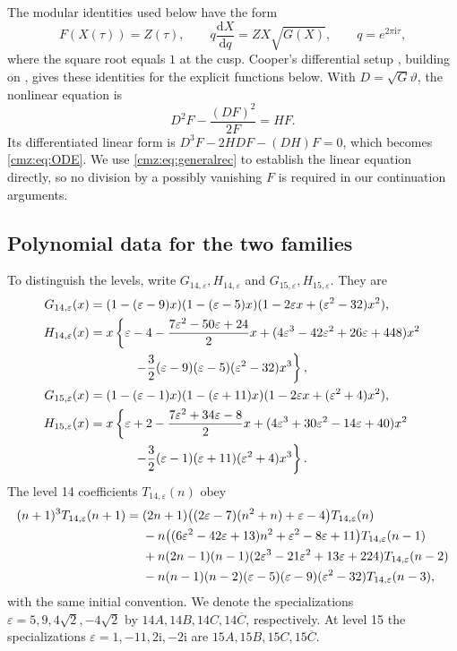 \documentclass[11pt,letterpaper]{article}
\numberwithin{equation}{section}
\theoremstyle{definition}\newtheorem{definition}[theorem]{Definition}
\theoremstyle{remark}\newtheorem{remark}[theorem]{Remark}
\newcommand{\eps}{\varepsilon}
\newcommand{\dd}{\mathrm d}
\newcommand{\ii}{\mathrm i}
\newcommand{\tht}{\vartheta}
\begin{document}
The modular identities used below have the form
\begin{equation}
F(X(\tau))=Z(\tau),\qquad
q\frac{\dd X}{\dd q}=ZX\sqrt{G(X)},\qquad q=e^{2\pi\ii\tau},
\label{cmz:eq:moddiff}
\end{equation}
where the square root equals $1$ at the cusp. Cooper's differential setup \cite[Sections 3--4, 7--9]{Cooper}, building on \cite{CGY,CY}, gives these identities for the explicit functions below. With $D=\sqrt G\tht$, the nonlinear equation is
\[
D^2F-\frac{(DF)^2}{2F}=HF.
\]
Its differentiated linear form is $D^3F-2HDF-(DH)F=0$, which becomes \eqref{cmz:eq:ODE}. We use \eqref{cmz:eq:generalrec} to establish the linear equation directly, so no division by a possibly vanishing $F$ is required in our continuation arguments.

\subsection{Polynomial data for the two families}
To distinguish the levels, write $G_{14,\eps},H_{14,\eps}$ and $G_{15,\eps},H_{15,\eps}$. They are
\begin{align}
G_{14,\eps}(x)
 &=(1-(\eps-9)x)(1-(\eps-5)x)
       (1-2\eps x+(\eps^2-32)x^2),\label{cmz:eq:G14}\\
H_{14,\eps}(x)
 &=x\left\{\eps-4-\frac{7\eps^2-50\eps+24}{2}x
 +(4\eps^3-42\eps^2+26\eps+448)x^2\right.\notag\\
 &\hspace{3.5em}\left.-\frac32(\eps-9)(\eps-5)(\eps^2-32)x^3\right\},
\label{cmz:eq:H14}\\
G_{15,\eps}(x)
 &=(1-(\eps-1)x)(1-(\eps+11)x)
       (1-2\eps x+(\eps^2+4)x^2),\label{cmz:eq:G15}\\
H_{15,\eps}(x)
 &=x\left\{\eps+2-\frac{7\eps^2+34\eps-8}{2}x
 +(4\eps^3+30\eps^2-14\eps+40)x^2\right.\notag\\
 &\hspace{3.5em}\left.-\frac32(\eps-1)(\eps+11)(\eps^2+4)x^3\right\}.
\label{cmz:eq:H15}
\end{align}
The level 14 coefficients $T_{14,\eps}(n)$ obey
\begin{align}
(n+1)^3T_{14,\eps}(n+1)
={}&(2n+1)\bigl((2\eps-7)(n^2+n)+\eps-4\bigr)T_{14,\eps}(n)\notag\\
&-n\bigl((6\eps^2-42\eps+13)n^2+\eps^2-8\eps+11\bigr)T_{14,\eps}(n-1)\notag\\
&+n(2n-1)(n-1)(2\eps^3-21\eps^2+13\eps+224)T_{14,\eps}(n-2)\notag\\
&-n(n-1)(n-2)(\eps-5)(\eps-9)(\eps^2-32)T_{14,\eps}(n-3),
\label{cmz:eq:14rec}
\end{align}
with the same initial convention. We denote the specializations $\eps=5,9,4\sqrt2,-4\sqrt2$ by $14A,14B,14C,14\overline C$, respectively. At level 15 the specializations $\eps=1,-11,2\ii,-2\ii$ are $15A,15B,15C,15\overline C$.
\end{document}
